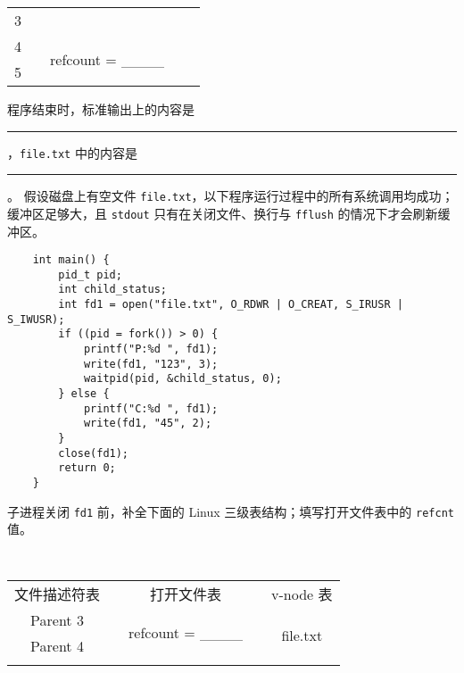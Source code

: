 \begin{problems}
\begin{table}[H]
\begin{tabular}{ccccc}
                \multicolumn{1}{|c|}{3} &  &  & \multicolumn{1}{c|}{} & \multicolumn{1}{c|}{} \\ \cline{1-1} \cline{3-3}
                \multicolumn{1}{|c|}{4} & \multicolumn{1}{c|}{} & \multicolumn{1}{c|}{\multirow{2}{*}{refcount = \_\_\_\_}} & \multicolumn{1}{c|}{} & \multicolumn{1}{c|}{} \\ \cline{1-1}
                \multicolumn{1}{|c|}{5} & \multicolumn{1}{c|}{} & \multicolumn{1}{c|}{} & \multicolumn{1}{c|}{} & \multicolumn{1}{c|}{} \\ \cline{1-1} \cline{3-3} \cline{5-5} 
            \end{tabular}
        \end{table}
        \qn 程序结束时，标准输出上的内容是 \rule{3.5cm}{0.25mm}，\verb|file.txt| 中的内容是 \rule{3.5cm}{0.25mm}。
        \pro 假设磁盘上有空文件 \verb|file.txt|，以下程序运行过程中的所有系统调用均成功；缓冲区足够大，且 \verb|stdout| 只有在关闭文件、换行与 \verb|fflush| 的情况下才会刷新缓冲区。
        \begin{verbatim}
    int main() {
        pid_t pid;
        int child_status;
        int fd1 = open("file.txt", O_RDWR | O_CREAT, S_IRUSR | S_IWUSR); 
        if ((pid = fork()) > 0) {
            printf("P:%d ", fd1);
            write(fd1, "123", 3);
            waitpid(pid, &child_status, 0);
        } else {
            printf("C:%d ", fd1);
            write(fd1, "45", 2);
        } 
        close(fd1);
        return 0;
    }
        \end{verbatim}
        \qn 子进程关闭 \verb|fd1| 前，补全下面的 Linux 三级表结构；填写打开文件表中的 \verb|refcnt| 值。
        \begin{table}[H]
            \tt
            \centering
            \begin{tabular}{ccccc}
                文件描述符表 & {\qquad \qquad \qquad} & 打开文件表 & {\qquad \qquad \qquad} & v-node 表 \\ \cline{1-1} \cline{3-3} \cline{5-5} 
                \multicolumn{1}{|c|}{Parent 3} & \multicolumn{1}{c|}{} & \multicolumn{1}{c|}{\multirow{2}{*}{refcount = \_\_\_\_}} & \multicolumn{1}{c|}{} & \multicolumn{1}{c|}{\multirow{6}{*}{file.txt}} \\ \cline{1-1}
                \multicolumn{1}{|c|}{Parent 4} & \multicolumn{1}{c|}{} & \multicolumn{1}{c|}{} & \multicolumn{1}{c|}{} & \multicolumn{1}{c|}{} \\ \cline{1-1} \cline{3-3}
                &  &  & \multicolumn{1}{c|}{} & \multicolumn{1}{c|}{} \\

\end{tabular}
\end{table}
\end{problems}
